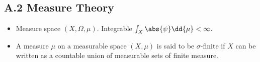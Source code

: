 
\subsection{A.2 Measure Theory}

\begin{itemize}
\item Measure space $(X,\Omega,\mu)$. Integrable $\int_X \abs{\psi} \dd{\mu} < \infty$.

\item A measure $\mu$ on a measurable space $(X, \mu)$ is said to be $\sigma$-finite if $X$ can be written as a countable union of measurable sets of finite measure.
\end{itemize}


